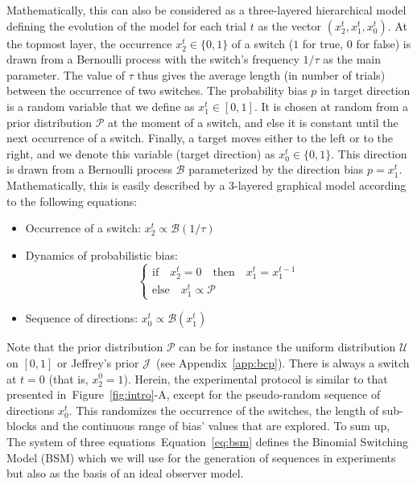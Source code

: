 \documentclass[12pt,english]{article}%
\newcommand{\choice}[1]{ %
	\left\{ %
		\begin{array}{l} #1 \end{array} %
	\right. }
\newcommand{\eql}[1]{\begin{equation}#1\end{equation}}
\newcommand{\Bb}{\mathcal{B}}
\newcommand{\Jj}{\mathcal{J}}
\newcommand{\Pp}{\mathcal{P}}
\newcommand{\Uu}{\mathcal{U}}
\newcommand{\seeFig}[1]{Figure~\ref{fig:#1}}
\newcommand{\seeEq}[1]{Equation~\ref{eq:#1}}
\newcommand{\seeApp}[1]{Appendix~\ref{app:#1}}
\newcommand{\AM}[1]{\textbf{\textcolor{blue}{[AM: #1]}}}
\begin{document}
Mathematically, this can also be considered as a three-layered hierarchical model
defining the evolution of the model for each trial $t$ as the vector  $(x_2^t, x_1^t, x_0^t)$.
At the topmost layer,
the occurrence $x_2^t \in \{ 0, 1 \}$ of a switch ($1$ for true, $0$ for false)
is  drawn from a Bernoulli process with the switch's frequency $1/\tau$ as the main parameter.
The value of $\tau$ thus gives the average length (in number of trials)
between the occurrence of two switches.
The probability bias $p$ in target direction is a random variable that we define as $x_1^t \in [0, 1]$.
It is chosen at random from a prior distribution $\Pp$ at the moment of a switch,
and else it is constant until the next occurrence of a switch.
Finally, a target moves either to the left or to the right,
and we denote this variable (target direction) as $x_0^t \in \{ 0, 1 \}$.
This direction is drawn from a Bernoulli process $\Bb$
parameterized by the direction bias $p=x_1^t$.
Mathematically, this is easily described
by a 3-layered graphical model according to %
the following equations:
\begin{itemize}
    \item Occurrence of a switch: $x_2^t \propto \Bb(1/\tau)$
    \item Dynamics of probabilistic bias: \eql{\choice{\text{if} \quad x_2^t=0 \quad \text{then} \quad  x_1^t = x_1^{t-1} \\
\text{else} \quad x_1^t \propto \Pp  }\label{eq:bsm}}
    \item Sequence of directions:  $x_0^t \propto \Bb(x_1^t)$
\end{itemize}
Note that the prior distribution $\Pp$ can be for instance
the uniform distribution $\Uu$ on $ [ 0, 1 ] $ or
Jeffrey's prior $\Jj$~(see \seeApp{bcp}).
There is always a switch at $t=0$ (that is, $x_2^0=1$). %
Herein, the experimental protocol is similar
to that presented in~\seeFig{intro}-A,
except for the pseudo-random sequence of directions $x_0^t$.
This randomizes the occurrence of the switches,
the length of sub-blocks
and the continuous range of bias' values that are explored.
To sum up, The system of three equations~\seeEq{bsm}
defines the Binomial Switching Model (BSM)
which we will use for the generation of sequences in experiments
but also as the basis of an ideal observer model.
\end{document}
